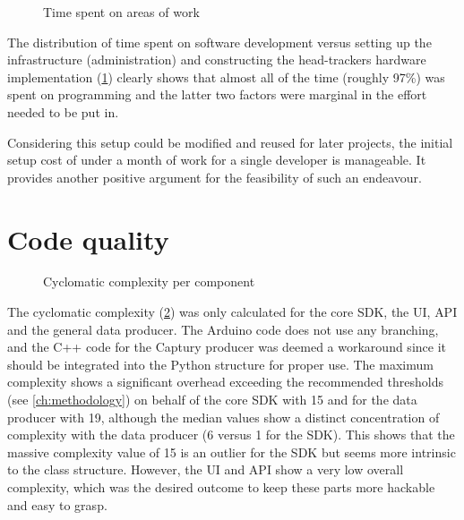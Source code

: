 \begin{figure}[h]
\centering

\caption[Time spent on areas of work]{Time spent on areas of work\protect}
\label{fig:timeSpentTypeOfWork}
\end{figure}

The distribution of time spent on software development versus setting up the infrastructure (administration) and constructing the head-tracker\textquotesingle s hardware implementation (\ref{fig:timeSpentTypeOfWork}) clearly shows that almost all of the time (roughly 97\%) was spent on programming and the latter two factors were marginal in the effort needed to be put in.

Considering this setup could be modified and reused for later projects, the initial setup cost of under a month of work for a single developer is manageable.
It provides another positive argument for the feasibility of such an endeavour.

\section{Code quality}
\label{sec:code-quality}

\begin{figure}[h]
\centering

\caption[Cyclomatic complexity]{Cyclomatic complexity per component\protect}
\label{fig:cyclomaticComplexity}
\end{figure}

The cyclomatic complexity (\ref{fig:cyclomaticComplexity}) was only calculated for the core \ac{SDK}, the \ac{UI}, \ac{API} and the general data producer.
The Arduino code does not use any branching, and the C++ code for the Captury producer was deemed a workaround since it should be integrated into the Python structure for proper use.
The maximum complexity shows a significant overhead exceeding the recommended thresholds (see \autoref{ch:methodology}) on behalf of the core \ac{SDK} with 15 and for the data producer with 19, although the median values show a distinct concentration of complexity with the data producer (6 versus 1 for the \ac{SDK}).
This shows that the massive complexity value of 15 is an outlier for the \ac{SDK} but seems more intrinsic to the  class structure.
However, the \ac{UI} and \ac{API} show a very low overall complexity, which was the desired outcome to keep these parts more hackable and easy to grasp.

